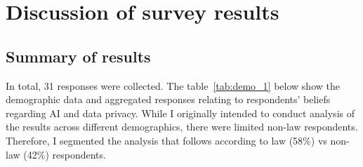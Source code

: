 \chapter{Discussion of survey results}

\label{chapter5}

\section{Summary of results}
In total, 31 responses were collected. The table~\ref{tab:demo_1} below show the demographic data and aggregated responses relating to respondents' beliefs regarding AI and data privacy. While I originally intended to conduct analysis of the results across different demographics, there were limited non-law respondents. Therefore, I segmented the analysis that follows according to law (58\%) vs non-law (42\%) respondents.

\begin{table}[!ht]
    \caption{Demographic breakdown of respondents according to academic discipline}
    \label{tab:demo_1}
\end{table}

